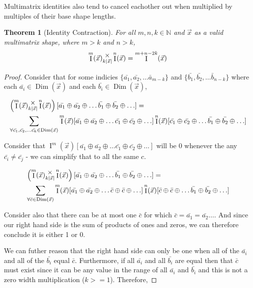 \documentclass[12pt]{book}
\theoremstyle{definition}
\theoremstyle{plain}
\newtheorem{theorem}{Theorem}[chapter]
\theoremstyle{ppart}
\theoremstyle{case}
\theoremstyle{solution}
\DeclareMathOperator{\Dim}{Dim}
\DeclareMathOperator{\Ident}{I}
\newcommand{\mmult}[1]{\text{\raisebox{1ex}{$\underset{#1}{\times}$}}}
\begin{document}
Multimatrix identities also tend to cancel eachother out when multiplied by
multiples of their base shape lengths.

\begin{landscape}
\begin{theorem}[Identity Contraction]
For all $m, n, k \in \mathbb{N}$ and $\vec{x}$ as a valid multimatrix shape,
where $m > k$ and $n > k$,
\[ \Ident^m(\vec{x}) \mmult{k|\vec{x}|} \Ident^n(\vec{x}) = \Ident^{m+n-2k}(\vec{x}) \]
\end{theorem}
\begin{proof}
Consider that for some indicies
$\{\bar{a_1}, \bar{a_2}, \ldots \bar{a}_{m-k}\}$
and $\{\bar{b_1}, \bar{b_2}, \ldots \bar{b}_{n-k}\}$ where each
$\bar{a_i} \in \Dim(\vec{x})$ and each $\bar{b_i} \in \Dim(\vec{x})$,

\begin{align*}
&\left( \Ident^m(\vec{x}) \mmult{k|\vec{x}|} \Ident^n(\vec{x}) \right)
[\bar{a_1} \oplus \bar{a_2} \oplus \ldots \bar{b_1} \oplus \bar{b_2} \oplus \ldots] = \\
&\sum_{\forall \bar{c_1}, \bar{c_2}, \ldots \bar{c_k} \in \Dim(\vec{x})}
\Ident^m(\vec{x})
[\bar{a_1} \oplus \bar{a_2} \oplus \ldots \bar{c_1} \oplus \bar{c_2} \oplus \ldots]
\Ident^n(\vec{x})
[\bar{c_1} \oplus \bar{c_2} \oplus \ldots \bar{b_1} \oplus \bar{b_2} \oplus \ldots]
\end{align*}

Consider that $\Ident^m(\vec{x})
[\bar{a_1} \oplus \bar{a_2} \oplus \ldots \bar{c_1} \oplus \bar{c_2} \oplus \ldots]$
will be 0 whenever the any $\bar{c_i} \ne \bar{c_j}$ - we can simplify that to all
the same $c$.

\begin{align*}
&\left( \Ident^m(\vec{x}) \mmult{k|\vec{x}|} \Ident^n(\vec{x}) \right)
[\bar{a_1} \oplus \bar{a_2} \oplus \ldots \bar{b_1} \oplus \bar{b_2} \oplus \ldots] = \\
&\sum_{\forall \bar{c} \in \Dim(\vec{x})}
\Ident^m(\vec{x})
[\bar{a_1} \oplus \bar{a_2} \oplus \ldots \bar{c} \oplus \bar{c} \oplus \ldots]
\Ident^n(\vec{x})
[\bar{c} \oplus \bar{c} \oplus \ldots \bar{b_1} \oplus \bar{b_2} \oplus \ldots]
\end{align*}

Consider also that there can be at most one $\bar{c}$ for which
$\bar{c} = \bar{a_1} = \bar{a_2} \ldots$. And since our right hand side is
the sum of products of ones and zeros, we can therefore conclude it is either 1 or 0.

We can futher reason that the right hand side can only be one when all of the
$\bar{a_i}$ and all of the $\bar{b_i}$ equal $\bar{c}$. Furthermore, if all
$\bar{a_i}$ and all $\bar{b_i}$ are equal then that $\bar{c}$ must exist since it can
be any value in the range of all $\bar{a_i}$ and $\bar{b_i}$ and this is not a
zero width multiplication ($k >= 1$). Therefore,


\end{proof}
\end{landscape}
\end{document}
